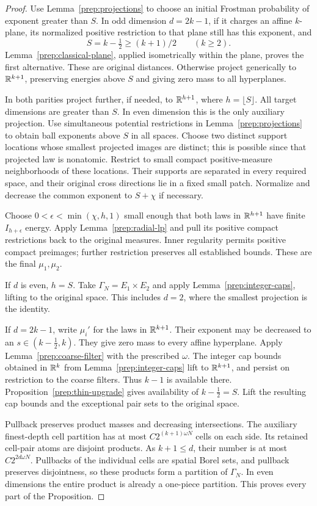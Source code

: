 \begin{proof}
Use Lemma~\ref{prep:projections} to choose an initial Frostman
probability of exponent greater than $S$. In odd dimension
$d=2k-1$, if it charges an affine $k$-plane, its normalized positive
restriction to that plane still has this exponent, and
\[
 S=k-\tfrac12\ge(k+1)/2\qquad(k\ge2).
\]
Lemma~\ref{prep:classical-plane}, applied isometrically within the
plane, proves the first alternative. These are original distances.
Otherwise project generically to $\mathbb R^{k+1}$, preserving energies
above $S$ and giving zero mass to all hyperplanes.

In both parities project further, if needed, to
$\mathbb R^{h+1}$, where $h=\lfloor S\rfloor$. All target dimensions
are greater than $S$. In even dimension this is the only auxiliary
projection. Use simultaneous potential restrictions in
Lemma~\ref{prep:projections} to obtain ball exponents above $S$
in all spaces. Choose two distinct support locations whose smallest
projected images are distinct; this is possible since that projected
law is nonatomic. Restrict to small compact positive-measure
neighborhoods of these locations. Their supports are separated in
every required space, and their original cross directions lie in a
fixed small patch. Normalize and decrease the common exponent to
$S+\chi$ if necessary.

Choose $0<\epsilon<\min(\chi,h,1)$ small enough that both laws in
$\mathbb R^{h+1}$ have finite $I_{h+\epsilon}$ energy. Apply
Lemma~\ref{prep:radial-lp} and pull its positive compact restrictions
back to the original measures. Inner regularity permits positive
compact preimages; further restriction preserves all established
bounds. These are the final $\mu_1,\mu_2$.

If $d$ is even, $h=S$. Take $\Gamma_N=E_1\times E_2$ and
apply Lemma~\ref{prep:integer-caps}, lifting to the original space.
This includes $d=2$, where the smallest projection is the identity.

If $d=2k-1$, write $\mu_i'$ for the laws in $\mathbb R^{k+1}$.
Their exponent may be decreased to an $s\in(k-\tfrac12,k)$.
They give zero mass to every affine hyperplane. Apply
Lemma~\ref{prep:coarse-filter} with the prescribed $\omega$.
The integer cap bounds obtained in $\mathbb R^k$ from
Lemma~\ref{prep:integer-caps} lift to $\mathbb R^{k+1}$, and persist
on restriction to the coarse filters. Thus $k-1$ is available there.
Proposition~\ref{prep:thin-upgrade} gives availability of
$k-\tfrac12=S$. Lift the resulting cap bounds and the exceptional
pair sets to the original space.

Pullback preserves product masses and decreasing intersections.
The auxiliary finest-depth cell partition has at most
$C2^{(k+1)\omega N}$ cells on each side. Its retained cell-pair
atoms are disjoint products. As $k+1\le d$, their number is at
most $C2^{2d\omega N}$. Pullbacks of the individual cells are
spatial Borel sets, and pullback preserves disjointness, so these
products form a partition of $\Gamma_N$. In even dimensions the
entire product is already a one-piece partition. This proves every
part of the Proposition.
\end{proof}

